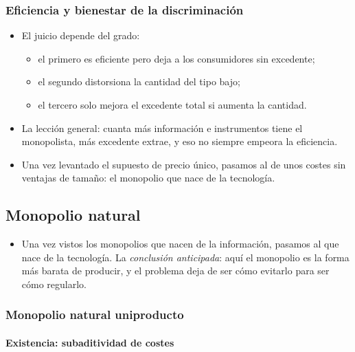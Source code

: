 \documentclass[11pt]{article}
\begin{document}
\subsubsection{Eficiencia y bienestar de la discriminación}\label{sec:eficiencia-bienestar-discriminacion}

\begin{itemize}
\item El juicio depende del grado:
  \begin{itemize}
  \item el primero es eficiente pero deja a los consumidores sin excedente;
  \item el segundo distorsiona la cantidad del tipo bajo;
  \item el tercero solo mejora el excedente total si aumenta la cantidad.
  \end{itemize}
\item La lección general: cuanta más información e instrumentos tiene el monopolista, más excedente extrae, y eso no siempre empeora la eficiencia.
\item Una vez levantado el supuesto de precio único, pasamos al de unos costes sin ventajas de tamaño: el monopolio que nace de la tecnología.
\end{itemize}

\subsection{Monopolio natural}\label{sec:monopolio-natural}

\begin{itemize}
\item Una vez vistos los monopolios que nacen de la información, pasamos al que nace de la tecnología. La \emph{conclusión anticipada}: aquí el monopolio es la forma más barata de producir, y el problema deja de ser cómo evitarlo para ser cómo regularlo.
\end{itemize}

\subsubsection{Monopolio natural uniproducto}\label{sec:monopolio-natural-uniproducto}

\paragraph{Existencia: subaditividad de costes}
\end{document}
